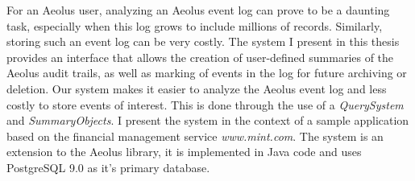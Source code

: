% 
% 
%
For an Aeolus user, analyzing an Aeolus event log can prove to be a daunting task, especially when this log grows to include millions of records. Similarly, storing such an event log can be very costly. The system I present in this thesis provides an interface that allows the creation of user-defined summaries of the Aeolus audit trails, as well as marking of events in the log for future archiving or deletion. Our system makes it easier to analyze the Aeolus event log and less costly to store events of interest. This is done through the use of a \emph{QuerySystem} and \emph{SummaryObjects}.
I present the system in the context of a sample application based on the financial management service \emph{www.mint.com}. The system is an extension to the Aeolus library, it is implemented in Java code and uses PostgreSQL 9.0 as it's primary database.




